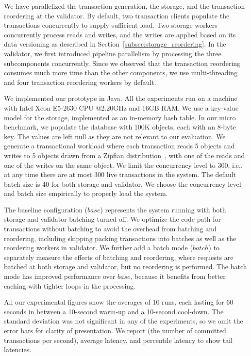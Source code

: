 We have parallelized the transaction generation, the storage, and the transaction reordering at the validator. By default, two transaction clients populate the transactions concurrently to supply sufficient load. Two storage workers concurrently process reads and writes, 
and the writes are applied based on its data versioning as described in Section~\ref{subsec:storage_reordering}. 
In the validator, we first introduced pipeline parallelism by processing the three subcomponents concurrently. Since we observed that the transaction reordering consumes much more time than the other components, we use multi-threading and four transaction reordering workers by default.

We implemented our prototype in Java. All the experiments run on a machine with
Intel Xeon E5-2630 CPU @2.20GHz and 16GB RAM. We use a key-value model for the
storage, implemented as an in-memory hash table. In our micro benchmark, we populate the database with 100K objects, each with an 8-byte key. The values are left null as they are not relevant to our evaluation. We generate a transactional workload where each transaction reads 5 objects and writes to 5 objects drawn from a Zipfian distribution~\cite{gray1994quickly}, with one of the reads and one of the writes on the same object. We limit the concurrency level to 300, i.e., at any time there are at most 300 live transactions in the system. The default batch size is 40 for both storage and validator. We choose the concurrency level and batch size empirically to properly load the system.

The baseline configuration ($base$) represents the system running with both storage and validator batching turned off. We optimize the code path for transactions without batching to avoid the overhead from batching and reordering, including skipping packing transactions into batches as well as the reordering workers in validator. We further add a batch mode ($batch$) to separately measure the effects of batching and reordering, where requests are batched at both storage and validator, but no reordering is performed. The batch mode has improved performance over $base$, because it benefits from better caching with tighter loops in the processing. 

All our experimental figures show the averages of 10 runs, each lasting for 60 seconds in between a 10-second warm-up and a 10-second cool-down. The standard deviation was not significant in any of the experiments, so we omit the error bars for clarity of presentation. We report  (the number of committed transactions per second), average latency, and percentile latency to show tail latencies.

